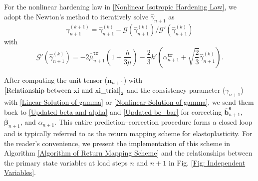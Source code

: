 \documentclass[preprint,11pt]{elsarticle}
\theoremstyle{definition}
\begin{document}
For the nonlinear hardening law in \eqref{Nonlinear Isotropic Hardening Law}, we adopt the Newton's method to iteratively solve $\widehat{\gamma}_{n+1}$ as
\begin{equation} \label{Nonlinear Solution of gamma}
    \widehat{\gamma}_{n+1}^{(k+1)} = \widehat{\gamma}_{n+1}^{(k)}
    - \mathcal{G}(\widehat{\gamma}_{n+1}^{(k)}) / \mathcal{G}'(\widehat{\gamma}_{n+1}^{(k)})
\end{equation}
with
\begin{equation*}
    \mathcal{G}'(\widehat{\gamma}_{n+1}^{(k)})
    = - 2 \overline{\overline{\mu}}_{n+1}^\texttt{tr} \left( 1 + \dfrac{h}{3\mu} \right)
    - \dfrac{2}{3} k' \left( \alpha_{n+1}^\texttt{tr} + \sqrt{\dfrac{2}{3}} \widehat{\gamma}_{n+1}^{(k)} \right).
\end{equation*}

After computing the unit tensor ($\mathbf{n}_{n+1}$) with $\eqref{Relationship between xi and xi_trial}_2$ and the consistency parameter ($\widehat{\gamma}_{n+1}$) with \eqref{Linear Solution of gamma} or \eqref{Nonlinear Solution of gamma}, we send them back to \eqref{Updated beta and alpha} and \eqref{Updated be_bar} for correcting $\overline{\mathbf{b}}_{n+1}^\texttt{e}$, $\overline{\boldsymbol{\beta}}_{n+1}$, and $\alpha_{n+1}$. This entire prediction--correction procedure forms a closed loop and is typically referred to as the return mapping scheme for elastoplasticity. For the reader's convenience, we present the implementation of this scheme in Algorithm \ref{Algorithm of Return Mapping Scheme} and the relationships between the primary state variables at load steps $n$ and $n+1$ in Fig. \ref{Fig: Independent Variables}.
\end{document}
